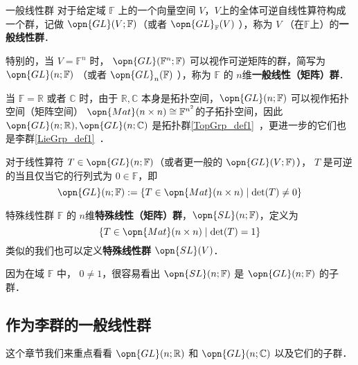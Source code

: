 
\begin{issues}
\issueDraft
\end{issues}


\begin{definition}{一般线性群}
对于给定域 $\mathbb{F}$ 上的一个向量空间 $V$，$V$上的全体可逆自线性算符构成一个群，记做 $\opn{GL}(V; \mathbb{F})$（或者 $\opn{GL}_{\mathbb{F}}(V)$ ），称为 $V$ （在$\mathbb{F}$上）的\textbf{一般线性群}．

特别的，当 $V = \mathbb{F}^n$ 时， $\opn{GL}(\mathbb{F}^n; \mathbb{F})$ 可以视作可逆矩阵的群，简写为 $\opn{GL}(n; \mathbb{F})$ （或者 $\opn{GL}_n(\mathbb{F})$ ），称为 $\mathbb{F}$ 的 $n$维\textbf{一般线性（矩阵）群}．

当 $\mathbb{F} = \mathbb{R}$ 或者 $\mathbb{C}$ 时，由于 $\mathbb{R}, \mathbb{C}$ 本身是拓扑空间，$\opn{GL}(n; \mathbb{F})$ 可以视作拓扑空间（矩阵空间） $\opn{Mat}(n \times n) \cong \mathbb{F}^{n^2}$的子拓扑空间，因此 $\opn{GL}(n; \mathbb{R}), \opn{GL}(n; \mathbb{C})$ 是拓扑群\autoref{TopGrp_def1}~，更进一步的它们也是李群\autoref{LieGrp_def1}~．
\end{definition}

对于线性算符 $T \in \opn{GL}(n; \mathbb{F})$（或者更一般的 $\opn{GL}(V; \mathbb{F})$）， $T$ 是可逆的当且仅当它的行列式为 $0 \in \mathbb{F}$，即
$$
\opn{GL}(n; \mathbb{F}): = \{T \in \opn{Mat}(n \times n) \mid \det(T) \neq 0\}
$$

\begin{definition}{特殊线性群}
$\mathbb{F}$ 的 $n$维\textbf{特殊线性（矩阵）群}，$\opn{SL}(n; \mathbb{F})$，定义为
$$
\{T \in \opn{Mat}(n \times n) \mid \det(T) = 1\}
$$
类似的我们也可以定义\textbf{特殊线性群} $\opn{SL}(V)$．
\end{definition}

因为在域 $\mathbb{F}$ 中， $0 \neq 1$，很容易看出 $\opn{SL}(n; \mathbb{F})$ 是 $\opn{GL}(n; \mathbb{F})$ 的子群．


\subsection{作为李群的一般线性群}

这个章节我们来重点看看 $\opn{GL}(n; \mathbb{R})$ 和 $\opn{GL}(n; \mathbb{C})$ 以及它们的子群．

